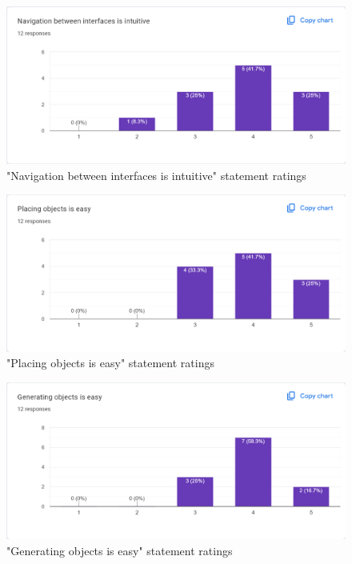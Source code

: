\documentclass[12pt, titlepage]{article}
\begin{document}
\begin{figure}[htbp]
  \caption{"Navigation between interfaces is intuitive" statement ratings}
  \centerline{\includegraphics[scale=0.35]{./Images/Q1.png}}
  \label{fig:StraightForward}
\end{figure}

\begin{figure}[htbp]
  \caption{"Placing objects is easy" statement ratings}
  \centerline{\includegraphics[scale=0.35]{./Images/Q2.png}}
  \label{fig:Navigation}
\end{figure}

\begin{figure}[htbp]
  \caption{"Generating objects is easy" statement ratings}
  \centerline{\includegraphics[scale=0.35]{./Images/Q3.png}}
  \label{fig:Detached}
\end{figure}
\end{document}
